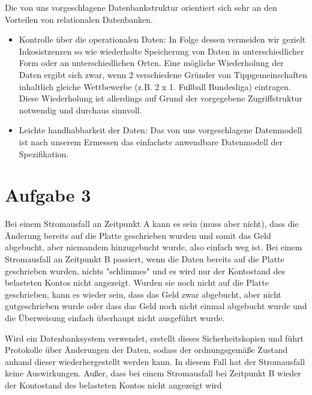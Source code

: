 \documentclass[12pt]{article}
\begin{document}
Die von uns vorgeschlagene Datenbankstruktur orientiert sich sehr an den Vorteilen von relationalen Datenbanken.
\begin{itemize}
 \item Kontrolle über die operationalen Daten: In Folge dessen vermeiden wir
 gezielt Inkosistzenzen so wie wiederholte Speicherung von Daten in unterschiedlicher Form oder an unterschiedlichen Orten. Eine mögliche Wiederholung der Daten
 ergibt sich zwar, wenn 2 verschiedene Gründer von Tippgemeinschaften inhaltlich gleiche Wettbewerbe (z.B. 2 x 1. Fußball Bundesliga) eintragen. Diese Wiederholung ist 
 allerdings auf Grund der vorgegebene Zugriffstruktur notwendig und durchaus sinnvoll.
 \item Leichte handhabbarkeit der Daten: Das von uns vorgeschlagene Datenmodell ist nach unserem Ermessen das einfachste anwendbare Datenmodell der Spezifikation.
\end{itemize}

\newpage
\section{Aufgabe 3}

Bei einem Stromausfall an Zeitpunkt A kann es sein (muss aber nicht),
dass die Änderung bereits auf die Platte geschrieben wurden und somit das Geld abgebucht,
aber niemandem hinzugebucht wurde, also einfach weg ist.
Bei einem Stromausfall an Zeitpunkt B passiert, wenn die Daten bereits auf die Platte geschrieben wurden, nichts "schlimmes" und es wird nur der Kontostand des belasteten Kontos nicht angezeigt.
Wurden sie noch nicht auf die Platte geschrieben, kann es wieder sein, dass das Geld zwar abgebucht, aber nicht gutgeschrieben wurde oder dass das Geld noch nicht einmal abgebucht wurde und die Überweisung einfach überhaupt nicht ausgeführt wurde.

Wird ein Datenbanksystem verwendet, erstellt dieses Sicherheitskopien und führt Protokolle über Änderungen der Daten, sodass der ordnungsgemäße Zustand anhand dieser wiederhergestellt werden kann. In diesem Fall hat der Stromausfall keine Auswirkungen. Außer, dass bei einem Stromausfall bei Zeitpunkt B wieder der Kontostand des belasteten Kontos nicht angezeigt wird
\end{document}
